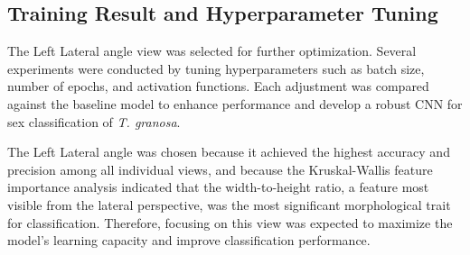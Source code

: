 \vspace{-0.1 cm}
\begin{table}[H]
	\centering
	\caption{Performance metrics for individual and combined angles (Batch Size: 16, Epochs: 20).}
	\label{tab:individual-combined}
\end{table}

\subsection{Training Result and Hyperparameter Tuning}
The Left Lateral angle view was selected for further optimization. Several experiments were conducted by tuning hyperparameters such as batch size, number of epochs, and activation functions. Each adjustment was compared against the baseline model to enhance performance and develop a robust CNN for sex classification of \textit{T. granosa}.

The Left Lateral angle was chosen because it achieved the highest accuracy and precision among all individual views, and because the Kruskal-Wallis feature importance analysis indicated that the width-to-height ratio, a feature most visible from the lateral perspective, was the most significant morphological trait for classification. Therefore, focusing on this view was expected to maximize the model's learning capacity and improve classification performance.

